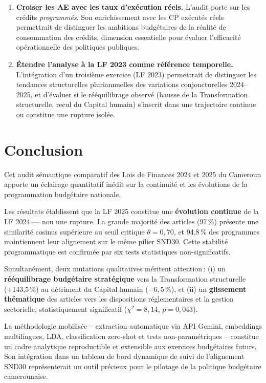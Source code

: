 \documentclass[12pt, a4paper]{article}
\begin{document}
\begin{enumerate}[label=\textbf{R\arabic*.}, leftmargin=2cm, itemsep=6pt]
  \item \textbf{Croiser les AE avec les taux d'exécution réels.}
  L'audit porte sur les crédits \textit{programmés}. Son enrichissement avec les CP exécutés réels 
  permettrait de distinguer les ambitions budgétaires de la réalité de consommation des crédits, 
  dimension essentielle pour évaluer l'efficacité opérationnelle des politiques publiques.

  \item \textbf{Étendre l'analyse à la LF 2023 comme référence temporelle.}
  L'intégration d'un troisième exercice (LF 2023) permettrait de distinguer les tendances 
  structurelles pluriannuelles des variations conjoncturelles 2024--2025, et d'évaluer si le 
  rééquilibrage observé (hausse de la Transformation structurelle, recul du Capital humain) s'inscrit 
  dans une trajectoire continue ou constitue une rupture isolée.

\end{enumerate}

\section*{Conclusion}

Cet audit sémantique comparatif des Lois de Finances 2024 et 2025 du Cameroun apporte un éclairage 
quantitatif inédit sur la continuité et les évolutions de la programmation budgétaire nationale.

Les résultats établissent que la LF 2025 constitue une \textbf{évolution continue} de la LF 2024 
— non une rupture. La grande majorité des articles (97\,\%) présente une similarité cosinus supérieure 
au seuil critique $\theta=0{,}70$, et 94,8\,\% des programmes maintiennent leur alignement sur le 
même pilier SND30. Cette stabilité programmatique est confirmée par six tests statistiques non-significatifs.

Simultanément, deux mutations qualitatives méritent attention\,: (i) un \textbf{rééquilibrage 
budgétaire stratégique} vers la Transformation structurelle (+143,5\,\%) au détriment du Capital humain 
($-6{,}5\,\%$), et (ii) un \textbf{glissement thématique} des articles vers les dispositions réglementaires 
et la gestion sectorielle, statistiquement significatif ($\chi^2=8{,}14$, $p=0{,}043$).

La méthodologie mobilisée -- extraction automatique via API Gemini, embeddings multilingues, 
LDA, classification zero-shot et tests non-paramétriques -- constitue un cadre analytique reproductible 
et extensible aux exercices budgétaires futurs. Son intégration dans un tableau de bord dynamique 
de suivi de l'alignement SND30 représenterait un outil précieux pour le pilotage de la politique 
budgétaire camerounaise.
\end{document}
